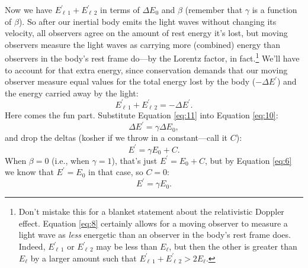 \documentclass[12pt]{article}
\begin{document}
Now we have $E_{\ell \, 1}^{\prime} + E_{\ell \, 2}^{\prime}$ in terms of $\Delta E_0$ and $\beta$ (remember that $\gamma$ is a function of $\beta$). So after our inertial body emits the light waves without changing its velocity, all observers agree on the amount of rest energy it's lost, but moving observers measure the light waves as carrying more (combined) energy than observers in the body's rest frame do---by the Lorentz factor, in fact.\footnote{Don't mistake this for a blanket statement about the relativistic Doppler effect. Equation \ref{eq:8} certainly allows for a moving observer to measure a light wave as \emph{less} energetic than an observer in the body's rest frame does. Indeed, $E_{\ell \, 1}^\prime$ or $E_{\ell \, 2}^\prime$ may be less than $E_{\ell}$, but then the other is greater than $E_{\ell}$ by a larger amount such that $E_{\ell \, 1}^{\prime} + E_{\ell \, 2}^{\prime} > 2E_{\ell}$.} We'll have to account for that extra energy, since conservation demands that our moving observer measure equal values for the total energy lost by the body ($-\Delta E^{\prime}$) and the energy carried away by the light:
\begin{equation}\label{eq:11}
E_{\ell \, 1}^{\prime} + E_{\ell \, 2}^{\prime}=-\Delta E^{\prime}.
\end{equation}
Here comes the fun part. Substitute Equation \ref{eq:11} into Equation \ref{eq:10}:
\begin{equation*}
\Delta E^{\prime} = \gamma \Delta E_0,
\end{equation*}
and drop the deltas (kosher if we throw in a constant---call it $C$):
\begin{equation*}
E^{\prime} = \gamma E_0 + C.
\end{equation*}
When $\beta = 0$ (i.e., when $\gamma = 1$), that's just $E^{\prime} = E_0 + C$, but by Equation \ref{eq:6} we know that $E^{\prime} = E_0$ in that case, so $C=0$:
\begin{equation*}
E^{\prime} = \gamma E_0.
\end{equation*}
\end{document}
